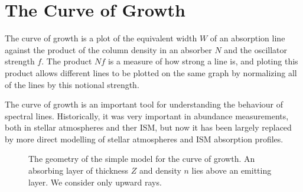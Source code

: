 \newslide

\section{The Curve of Growth}

The curve of growth is a plot of the equivalent width
$W$ of an absorption line against the product of the
column density in an absorber $N$ and the oscillator
strength $f$. The product $Nf$ is a measure of how strong a
line is, and ploting this product allows different lines to
be plotted on the same graph by normalizing all of the lines
by this notional strength.

The curve of growth is an important tool for understanding
the behaviour of spectral lines. Historically, it was very
important in abundance measurements, both in stellar
atmospheres and ther ISM, but now it has been largely
replaced by more direct modelling of stellar atmospheres and
ISM absorption profiles.

\begin{figure}
\begin{center}
\end{center}
\caption{The geometry of the simple model for the curve of growth. An absorbing layer of thickness $Z$ and density $n$ lies above an emitting layer. We consider only upward rays.}
\label{figure:curve-of-growth-geometry}
\end{figure}

